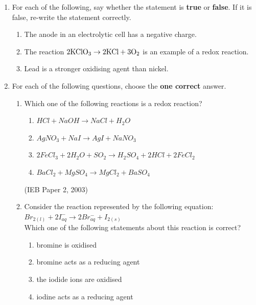 \begin{eocexercises}{}

\begin{enumerate}

\item{For each of the following, say whether the statement is \textbf{true} or \textbf{false}. If it is false, re-write the statement correctly.}
	\begin{enumerate}
	\item{The anode in an electrolytic cell has a negative charge.}
	\item{The reaction $\rm{2KClO_{3} \rightarrow 2KCl + 3O_{2}}$ is an example of a redox reaction.}
	\item{Lead is a stronger oxidising agent than nickel.}
	\end{enumerate}

\item{For each of the following questions, choose the \textbf{one correct} answer.}

	\begin{enumerate}
	\item{Which one of the following reactions is a redox reaction?}
		\begin{enumerate}
		\item{\rm${HCl + NaOH \rightarrow NaCl + H_{2}O}$}
		\item{\rm${AgNO_{3} + NaI \rightarrow AgI + NaNO_{3}}$}
		\item{\rm${2FeCl_{3} + 2H_{2}O + SO_{2} \rightarrow H_{2}SO_{4} + 2HCl + 2FeCl_{2}}$}
		\item{\rm${BaCl_{2} + MgSO_{4} \rightarrow MgCl_{2} + BaSO_{4}}$}
		\end{enumerate}
(IEB Paper 2, 2003) 
	\item{Consider the reaction represented by the following equation:\\

\rm${Br_{2(l)} + 2I^{-}_{aq} \rightarrow 2Br^{-}_{aq} + I_{2(s)}}$\\

Which one of the following statements about this reaction is correct?}
	
		\begin{enumerate}
		\item{bromine is oxidised}
		\item{bromine acts as a reducing agent}
		\item{the iodide ions are oxidised}
		\item{iodine acts as a reducing agent}
		\end{enumerate}


\end{enumerate}
\end{enumerate}
\end{eocexercises}

